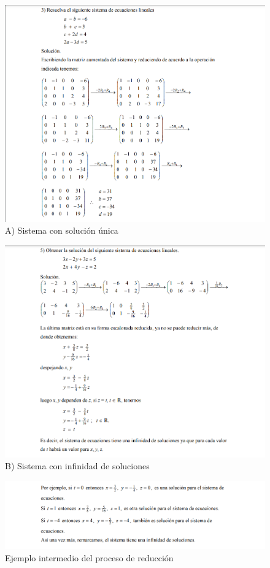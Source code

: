 \documentclass[a4paper,10pt]{article}
\begin{document}
\begin{figure}[H]
    \centering
    \includegraphics[width=1\linewidth]{image.png}
    \caption{A) Sistema con solución única}
\end{figure}
\vspace{2em}
\begin{figure}[H]
    \centering
    \includegraphics[width=1\linewidth]{2.png}
    \caption{B) Sistema con infinidad de soluciones}
\end{figure}
\vspace{4em}
\begin{figure}[H]
    \centering
    \includegraphics[width=1\linewidth]{3.png}
    \caption{Ejemplo intermedio del proceso de reducción}
\end{figure}
\end{document}
